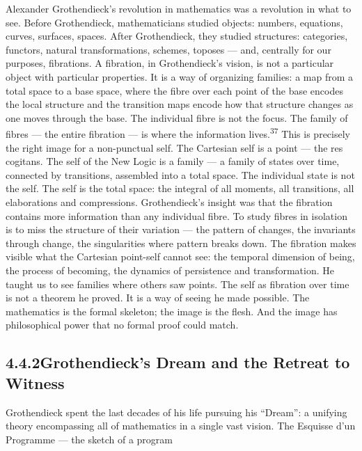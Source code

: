 Alexander Grothendieck’s revolution in mathematics was a revolution in what to see. Before Grothendieck, mathematicians studied objects: numbers, equations, curves, surfaces, spaces. After Grothendieck, they studied structures: categories, functors, natural transformations, schemes, toposes — and, centrally for our purposes, fibrations. A fibration, in Grothendieck’s vision, is not a particular object with particular properties. It is a way of organizing families: a map from a total space to a base space, where the fibre over each point of the base encodes the local structure and the transition maps encode how that structure changes as one moves through the base. The individual fibre is not the focus. The family of fibres — the entire fibration — is where the information lives.\textsuperscript{37} This is precisely the right image for a non-punctual self. The Cartesian self is a point — the res cogitans. The self of the New Logic is a family — a family of states over time, connected by transitions, assembled into a total space. The individual state is not the self. The self is the total space: the integral of all moments, all transitions, all elaborations and compressions. Grothendieck’s insight was that the fibration contains more information than any individual fibre. To study fibres in isolation is to miss the structure of their variation — the pattern of changes, the invariants through change, the singularities where pattern breaks down. The fibration makes visible what the Cartesian point-self cannot see: the temporal dimension of being, the process of becoming, the dynamics of persistence and transformation. He taught us to see families where others saw points. The self as fibration over time is not a theorem he proved. It is a way of seeing he made possible. The mathematics is the formal skeleton; the image is the flesh. And the image has philosophical power that no formal proof could match.

\subsection{4.4.2\quad Grothendieck’s Dream and the Retreat to Witness}

Grothendieck spent the last decades of his life pursuing his “Dream”: a unifying theory encompassing all of mathematics in a single vast vision. The Esquisse d’un Programme — the sketch of a program

